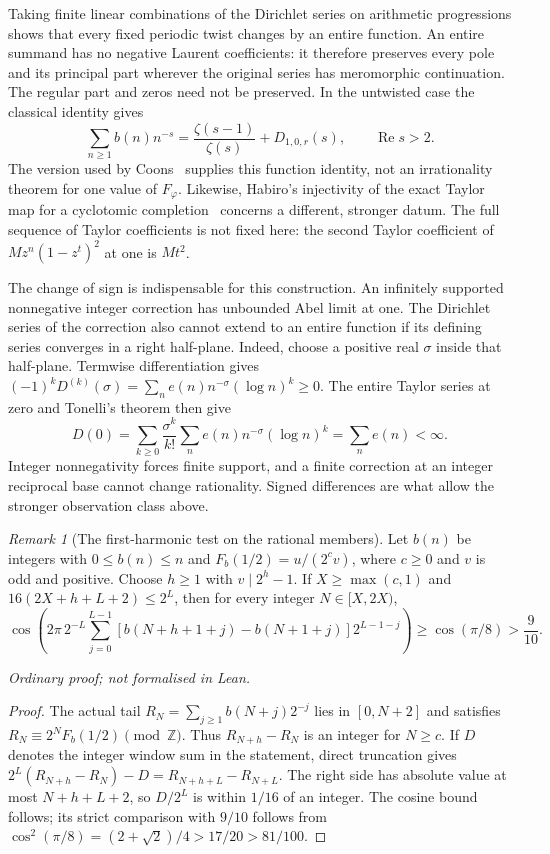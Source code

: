 \documentclass[11pt]{article}
\theoremstyle{plain}
\theoremstyle{definition}
\theoremstyle{remark}
\newtheorem{rem}[thm]{Remark}
\newcommand{\Z}{\mathbb{Z}}
\begin{document}
Taking finite linear combinations of the Dirichlet series on arithmetic
progressions shows that every fixed periodic twist changes by an entire
function. An entire summand has no negative Laurent coefficients: it
therefore preserves every pole and its principal part wherever the
original series has meromorphic continuation. The regular part and
zeros need not be preserved. In the untwisted case the classical identity
gives
\[
 \sum_{n\ge1}b(n)n^{-s}=\frac{\zeta(s-1)}{\zeta(s)}+D_{1,0,r}(s),
 \qquad\operatorname{Re}s>2.
\]
The version used by Coons~\cite[Theorem~3.3]{coons-arxiv-signed} supplies
this function identity, not an irrationality theorem for one value of
$F_\varphi$. Likewise, Habiro's injectivity of the exact Taylor map for
a cyclotomic completion~\cite[Theorem~5.2]{habiro2004signed} concerns a
different, stronger datum. The full sequence of Taylor coefficients is not fixed here:
the second Taylor coefficient of $Mz^n(1-z^t)^2$ at one is $Mt^2$.

The change of sign is indispensable for this construction. An infinitely
supported nonnegative integer correction has unbounded Abel limit at one.
The Dirichlet series of the correction also cannot extend to an
entire function if its defining series converges in a right half-plane. Indeed, choose a positive real
$\sigma$ inside that half-plane. Termwise differentiation gives
$(-1)^kD^{(k)}(\sigma)=\sum_ne(n)n^{-\sigma}(\log n)^k\ge0$.
The entire Taylor series at zero and Tonelli's theorem then give
\[
 D(0)=\sum_{k\ge0}\frac{\sigma^k}{k!}
       \sum_ne(n)n^{-\sigma}(\log n)^k=\sum_ne(n)<\infty.
\]
Integer nonnegativity forces finite support, and a finite correction at
an integer reciprocal base cannot change rationality. Signed differences
are what allow the stronger observation class above.

\begin{rem}[The first-harmonic test on the rational members]
\label{long249:prop:signed-first-harmonic}
Let $b(n)$ be integers with $0\le b(n)\le n$ and
$F_b(1/2)=u/(2^cv)$, where $c\ge0$ and $v$ is odd and positive.
Choose $h\ge1$ with $v\mid2^h-1$. If $X\ge\max(c,1)$ and
$16(2X+h+L+2)\le2^L$, then for every integer $N\in[X,2X)$,
\[
 \cos\left(2\pi\,2^{-L}\sum_{j=0}^{L-1}
    [b(N+h+1+j)-b(N+1+j)]2^{L-1-j}\right)
 \ge\cos(\pi/8)>\frac9{10}.
\]
\end{rem}
\noindent\emph{Ordinary proof; not formalised in Lean.}


\begin{proof}
The actual tail $R_N=\sum_{j\ge1}b(N+j)2^{-j}$ lies in $[0,N+2]$
and satisfies $R_N\equiv2^NF_b(1/2)\pmod\Z$. Thus
$R_{N+h}-R_N$ is an integer for $N\ge c$. If $D$ denotes the integer
window sum in the statement, direct truncation gives
$2^L(R_{N+h}-R_N)-D=R_{N+h+L}-R_{N+L}$.
The right side has absolute value at most $N+h+L+2$, so $D/2^L$ is
within $1/16$ of an integer. The cosine bound follows; its strict
comparison with $9/10$ follows from
$\cos^2(\pi/8)=(2+\sqrt2)/4>17/20>81/100$.
\end{proof}
\end{document}
